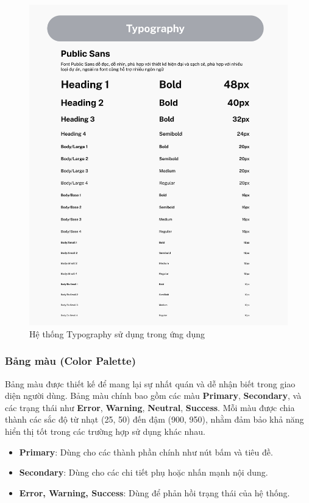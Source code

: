 \begin{figure}[H]
    \centering
    \includegraphics[scale=0.3]{Images/Implement/Typography.png}
    \caption{Hệ thống Typography sử dụng trong ứng dụng}
\end{figure}

\subsubsection*{Bảng màu (Color Palette)}
Bảng màu được thiết kế để mang lại sự nhất quán và dễ nhận biết trong giao diện người dùng. Bảng màu chính bao gồm các màu \textbf{Primary}, \textbf{Secondary}, và các trạng thái như \textbf{Error}, \textbf{Warning}, \textbf{Neutral}, \textbf{Success}. Mỗi màu được chia thành các sắc độ từ nhạt (25, 50) đến đậm (900, 950), nhằm đảm bảo khả năng hiển thị tốt trong các trường hợp sử dụng khác nhau.

\begin{itemize}
    \item \textbf{Primary}: Dùng cho các thành phần chính như nút bấm và tiêu đề.
    \item \textbf{Secondary}: Dùng cho các chi tiết phụ hoặc nhấn mạnh nội dung.
    \item \textbf{Error, Warning, Success}: Dùng để phản hồi trạng thái của hệ thống.
\end{itemize}

